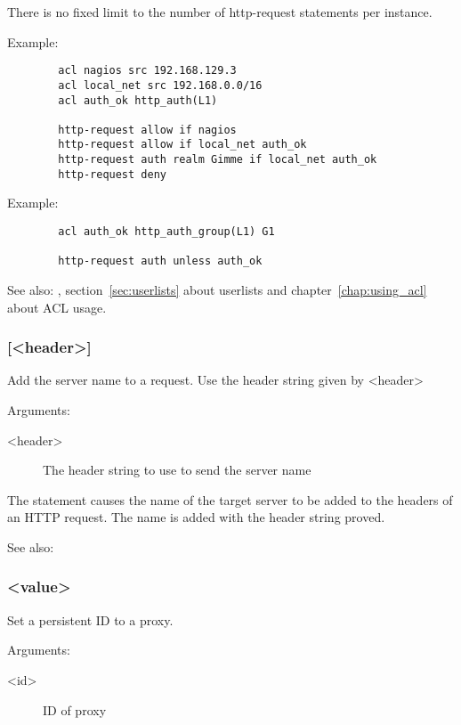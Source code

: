   There is no fixed limit to the number of http-request statements per
  instance.

  Example:
  \begin{verbatim}
        acl nagios src 192.168.129.3
        acl local_net src 192.168.0.0/16
        acl auth_ok http_auth(L1)

        http-request allow if nagios
        http-request allow if local_net auth_ok
        http-request auth realm Gimme if local_net auth_ok
        http-request deny
    \end{verbatim}

  Example:
\begin{verbatim}
        acl auth_ok http_auth_group(L1) G1

        http-request auth unless auth_ok
\end{verbatim}

  See also: , section~\ref{sec:userlists} about userlists and chapter~\ref{chap:using_acl}
             about ACL usage.

\subsubsection[http-send-name-header]{ [<header>]}

  Add the server name to a request. Use the header string given by <header>


  Arguments:
  
\begin{description}
\item[ <header>]  The header string to use to send the server name
\end{description}

  The  statement causes the name of the target
  server to be added to the headers of an HTTP request.  The name
  is added with the header string proved.

  See also: 

\subsubsection[id]{ <value>}

  Set a persistent ID to a proxy.
  
  
  Arguments:
\begin{description}
\item[<id>] ID of proxy 
\end{description}

